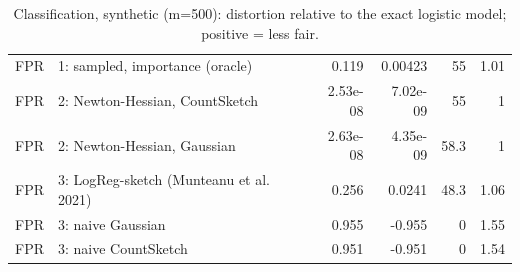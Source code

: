 \begin{table}[t]
\begin{tabular}{llrrrr}
FPR & 1: sampled, importance (oracle) & 0.119 & 0.00423 & 55 & 1.01 \\
FPR & 2: Newton-Hessian, CountSketch & 2.53e-08 & 7.02e-09 & 55 & 1 \\
FPR & 2: Newton-Hessian, Gaussian & 2.63e-08 & 4.35e-09 & 58.3 & 1 \\
FPR & 3: LogReg-sketch (Munteanu et al. 2021) & 0.256 & 0.0241 & 48.3 & 1.06 \\
FPR & 3: naive Gaussian & 0.955 & -0.955 & 0 & 1.55 \\
FPR & 3: naive CountSketch & 0.951 & -0.951 & 0 & 1.54 \\
\bottomrule
\end{tabular}
\caption{Classification, synthetic (m=500): distortion relative to the exact logistic model; positive = less fair.}
\label{tab:s4c_synth_table}
\end{table}